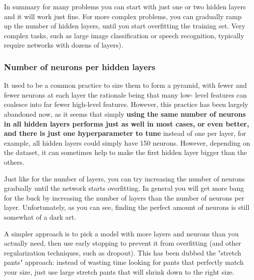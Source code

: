 \documentclass[12pt, letterpaper]{article}
\theoremstyle{definition}
\let\tb\textbf
\begin{document}
In summary for many problems you can start with just one or two hidden layers and it will work just fine. For more complex problems, you can gradually ramp up the number of hidden layers, until you start overfitting the training set. Very complex tasks, such as large image classification or speech recognition, typically require networks with dozens of layers).

\subsubsection{Number of neurons per hidden layers}
It used to be a common practice to size them to form a pyramid, with fewer and fewer neurons at each layer the rationale being that many low- level features can coalesce into far fewer high-level features. However, this practice has been largely abandoned now, as it seems that simply \tb{using the same number of neurons in all hidden layers performs just as well in most cases, or even better, and there is just one hyperparameter to tune} instead of one per layer, for example, all hidden layers could simply have 150 neurons. However, depending on the dataset, it can sometimes help to make the first hidden layer bigger than the others.

Just like for the number of layers, you can try increasing the number of neurons gradually until the network starts overfitting. In general you will get more bang for the buck by increasing the number of layers than the number of neurons per layer. Unfortunately, as you can see, finding the perfect amount of neurons is still somewhat of a dark art.

A simpler approach is to pick a model with more layers and neurons than you actually need, then use early stopping to prevent it from overfitting (and other regularization techniques, such as dropout). This has been dubbed the "stretch pants" approach: instead of wasting time looking for pants that perfectly match your size, just use large stretch pants that will shrink down to the right size.
\end{document}
